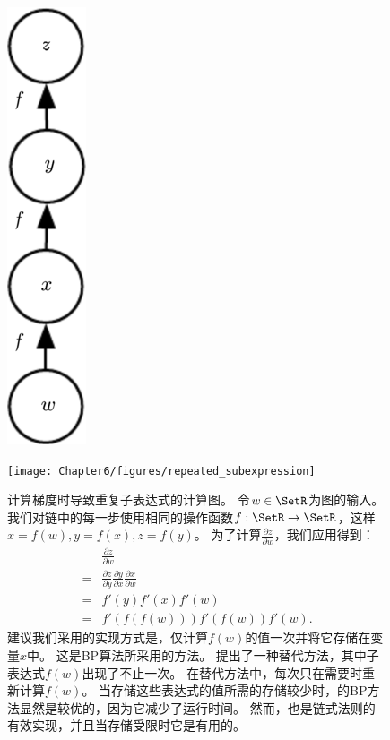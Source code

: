 \begin{figure}[!htb]
\ifOpenSource
\centerline{\includegraphics[scale=0.5]{images/51.png}}
\else
\centerline{\texttt{[image: Chapter6/figures/repeated\_subexpression]}}
\fi
\captionsetup{singlelinecheck=off}
\caption[.]{
计算梯度时导致重复子表达式的计算图。
令$w \in \SetR$为图的输入。
我们对链中的每一步使用相同的操作函数$f: \SetR \to \SetR$，这样$x=f(w), y=f(x), z=f(y)$。
为了计算$\frac{\partial z}{\partial w}$，我们应用得到：
\begin{align}
& \frac{\partial z}{\partial w}\\
=& \frac{\partial z}{\partial y} \frac{\partial y}{\partial x} \frac{\partial x}{\partial w}\\
\label{eq:6.52}
=& f'(y)f'(x)f'(w)\\ 
\label{eq:6.53}
=& f'(f(f(w))) f'(f(w)) f'(w). 
\end{align}
建议我们采用的实现方式是，仅计算$f(w)$的值一次并将它存储在变量$x$中。
这是\gls{BP}算法所采用的方法。
提出了一种替代方法，其中子表达式$f(w)$出现了不止一次。
在替代方法中，每次只在需要时重新计算$f(w)$。
当存储这些表达式的值所需的存储较少时，的\gls{BP}方法显然是较优的，因为它减少了运行时间。
然而，也是链式法则的有效实现，并且当存储受限时它是有用的。}
\label{fig:chap6_repeated_subexpression}
\end{figure}

